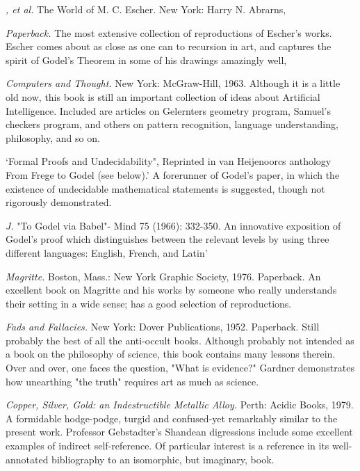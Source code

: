 {\sl , et al.} \llap{**\enspace}The World of M. C. Escher. New York: Harry N. Abrarns,

 {\sl Paperback.} The most extensive collection of reproductions of Escher's works. Escher comes about as close as one can to recursion in art, and captures the spirit of Godel's Theorem in some of his drawings amazingly well,

 {\sl Computers and Thought.} New York: McGraw-Hill, 1963. Although it is a little old now, this book is still an important collection of ideas about Artificial Intelligence. Included are articles on Gelernters geometry program, Samuel's checkers program, and others on pattern recognition, language understanding, philosophy, and so on.

 `Formal Proofs and Undecidability", Reprinted in van Heijenoorcs anthology From Frege to Godel (see below).' A forerunner of Godel's paper, in which the existence of undecidable mathematical statements is suggested, though not rigorously demonstrated.

 {\sl J.} "To Godel via Babel"- Mind 75 (1966): 332-350. An innovative exposition of Godel's proof which distinguishes between the relevant levels by using three different languages: English, French, and Latin'

 {\sl Magritte.} \llap{*\enspace}Boston, Mass.: New York Graphic Society, 1976. Paperback. An excellent book on Magritte and his works by someone who really understands their setting in a wide sense; has a good selection of reproductions.

 {\sl Fads and Fallacies.} \llap{*\enspace}New York: Dover Publications, 1952. Paperback. Still probably the best of all the anti-occult books. Although probably not intended as a book on the philosophy of science, this book contains many lessons therein. Over and over, one faces the question, "What is evidence?" Gardner demonstrates how unearthing "the truth" requires art as much as science.

 {\sl Copper, Silver, Gold: an Indestructible Metallic Alloy.} Perth: Acidic Books, 1979. A formidable hodge-podge, turgid and confused-yet remarkably similar to the present work. Professor Gebstadter's Shandean digressions include some excellent examples of indirect self-reference. Of particular interest is a reference in its well-annotated bibliography to an isomorphic, but imaginary, book.

